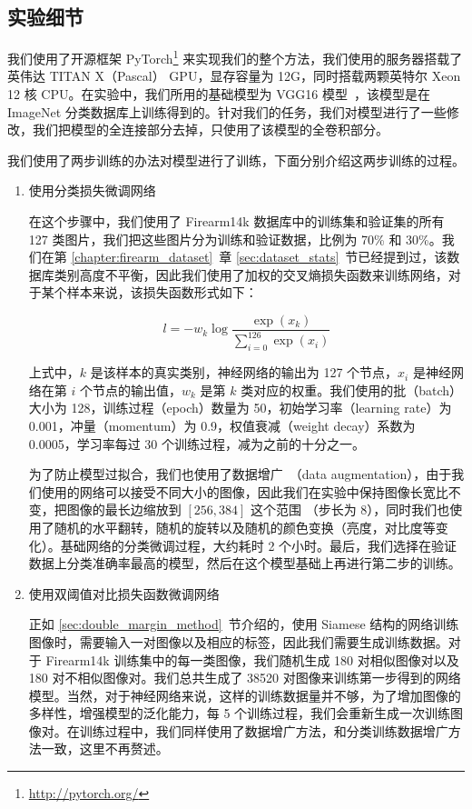 \subsection{实验细节}
我们使用了开源框架 PyTorch\footnote{\url{http://pytorch.org/}} 来实现我们的整个方法，我们使用的服务器搭载了英伟达 TITAN X（Pascal） GPU，显存容量为 12G，同时搭载两颗英特尔 Xeon 12 核 CPU。在实验中，我们所用的基础模型为 VGG16 模型~\cite{Simonyan2014VeryDC}，该模型是在 ImageNet 分类数据库上训练得到的。针对我们的任务，我们对模型进行了一些修改，我们把模型的全连接部分去掉，只使用了该模型的全卷积部分。

我们使用了两步训练的办法对模型进行了训练，下面分别介绍这两步训练的过程。

\begin{enumerate}
\item 使用分类损失微调网络

在这个步骤中，我们使用了 Firearm14k 数据库中的训练集和验证集的所有 127 类图片，我们把这些图片分为训练和验证数据，比例为 70\% 和 30\%。我们在第 \ref{chapter:firearm_dataset}~章 \ref{sec:dataset_stats}~节已经提到过，该数据库类别高度不平衡，因此我们使用了加权的交叉熵损失函数来训练网络，对于某个样本来说，该损失函数形式如下：

\begin{equation}
l = -w_k \log\frac{\exp(x_k)}{\sum_{i=0}^{126} \exp(x_i)}
\end{equation}

上式中，$k$ 是该样本的真实类别，神经网络的输出为 127 个节点，$x_i$ 是神经网络在第 $i$ 个节点的输出值，$w_k$ 是第 $k$ 类对应的权重。我们使用的批（batch）大小为 128，训练过程（epoch）数量为 50，初始学习率（learning rate）为 0.001，冲量（momentum）为 0.9，权值衰减（weight decay）系数为 0.0005，学习率每过 30 个训练过程，减为之前的十分之一。

为了防止模型过拟合，我们也使用了数据增广~\cite{Krizhevsky2012ImageNetCW}（data augmentation），由于我们使用的网络可以接受不同大小的图像，因此我们在实验中保持图像长宽比不变，把图像的最长边缩放到 $[256, 384]$ 这个范围 （步长为 8），同时我们也使用了随机的水平翻转，随机的旋转以及随机的颜色变换（亮度，对比度等变化）。基础网络的分类微调过程，大约耗时 2 个小时。最后，我们选择在验证数据上分类准确率最高的模型，然后在这个模型基础上再进行第二步的训练。

\item 使用双阈值对比损失函数微调网络

正如 \ref{sec:double_margin_method}~节介绍的，使用 Siamese 结构的网络训练图像时，需要输入一对图像以及相应的标签，因此我们需要生成训练数据。对于 Firearm14k 训练集中的每一类图像，我们随机生成 180 对相似图像对以及 180 对不相似图像对。我们总共生成了 38520 对图像来训练第一步得到的网络模型。当然，对于神经网络来说，这样的训练数据量并不够，为了增加图像的多样性，增强模型的泛化能力，每 5 个训练过程，我们会重新生成一次训练图像对。在训练过程中，我们同样使用了数据增广方法，和分类训练数据增广方法一致，这里不再赘述。


\end{enumerate}
